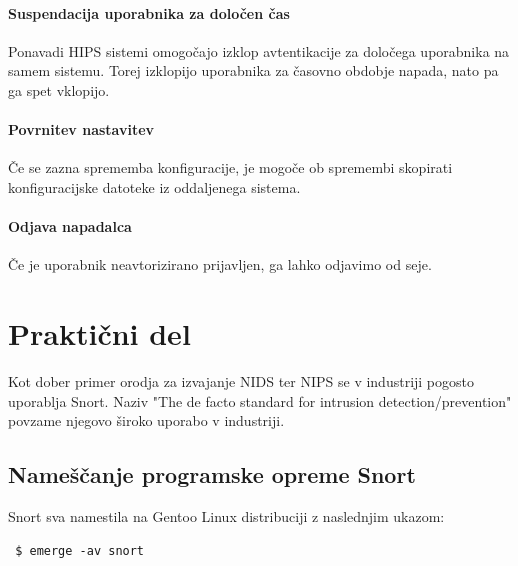\documentclass[12pt]{article}
\let\stdsection\section
\renewcommand\section{\newpage\stdsection}
\begin{document}

\paragraph{Suspendacija uporabnika za določen čas} %

Ponavadi HIPS sistemi omogočajo izklop avtentikacije za določega uporabnika na samem sistemu.
Torej izklopijo uporabnika za časovno obdobje napada, nato pa ga spet vklopijo.


\paragraph{Povrnitev nastavitev} %

Če se zazna sprememba konfiguracije, je mogoče ob spremembi skopirati konfiguracijske datoteke iz oddaljenega sistema.


\paragraph{Odjava napadalca} %

Če je uporabnik neavtorizirano prijavljen, ga lahko odjavimo od seje.





\section{Praktični del}

Kot dober primer orodja za izvajanje NIDS ter NIPS se v industriji pogosto uporablja Snort. Naziv
"The de facto standard for intrusion detection/prevention" povzame njegovo široko uporabo v industriji.


\subsection{Nameščanje programske opreme Snort}

Snort sva namestila na Gentoo Linux distribuciji z naslednjim ukazom:

\begin{verbatim}
 $ emerge -av snort
\end{verbatim}
\end{document}
